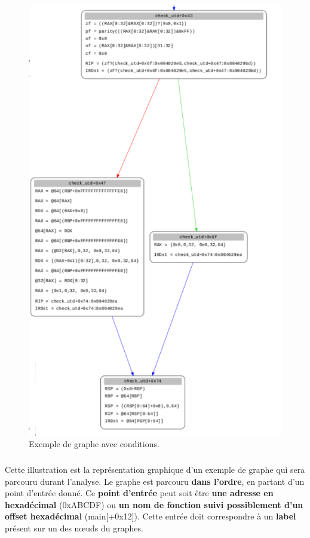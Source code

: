 \begin{figure}[h]
    \centering
    \includegraphics[scale=0.3]{condition.png}\newline
    \caption{Exemple de graphe avec conditions.}
\end{figure}
\subparagraph{}
Cette illustration est la représentation graphique d'un exemple de graphe qui sera parcouru durant l'analyse. Le graphe est parcouru \textbf{dans l'ordre},
en partant d'un point d'entrée donné. Ce \textbf{point d'entrée} peut soit être \textbf{une adresse en hexadécimal} (0xABCDF) ou \textbf{un nom de fonction
suivi possiblement d'un offset hexadécimal} (main[+0x12]). Cette entrée doit correspondre à un \textbf{label} présent sur un des nœuds du graphes.
